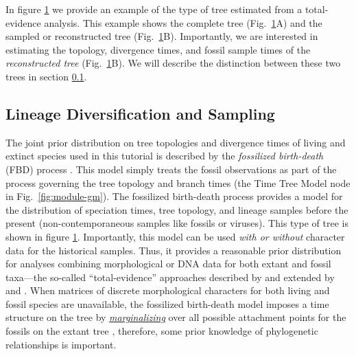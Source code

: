 In figure \ref{fig:example-tree} we provide an example of the type of tree estimated from a total-evidence analysis.
This example shows the complete tree (Fig.\ \ref{fig:example-tree}A) and the sampled or reconstructed tree (Fig.\ \ref{fig:example-tree}B). 
Importantly, we are interested in estimating the topology, divergence times, and fossil sample times of the \textit{reconstructed tree} (Fig.\ \ref{fig:example-tree}B). 
We will describe the distinction between these two trees in section \ref{subsect:Intro-FBD}.
\begin{figure}[h!]
\label{fig:example-tree}
\end{figure}


\subsection{Lineage Diversification and Sampling}\label{subsect:Intro-FBD}

The joint prior distribution on tree topologies and divergence times of living and extinct species used in this tutorial is described by the \textit{fossilized birth-death} (FBD) process \citep{Stadler2010, Heath2014}. 
This model simply treats the fossil observations as part of the process governing the tree topology and branch times (the \textsf{Time Tree Model} node in Fig.\ \ref{fig:module-gm}). 
The fossilized birth-death process provides a model for the distribution of speciation times, tree topology, and lineage samples before the present (\EG non-contemporaneous samples like fossils or viruses). 
This type of tree is shown in figure \ref{fig:example-tree}. 
Importantly, this model can be used \textit{with or without} character data for the historical samples. 
Thus, it provides a reasonable prior distribution for analyses combining morphological or DNA data for both extant and fossil taxa---\IE the so-called ``total-evidence'' approaches described by \citet{Ronquist2012a} and extended by \citet{Zhang2016} and \citet{Gavryushkina2016}. 
When matrices of discrete morphological characters for both living and fossil species are unavailable, the fossilized birth-death model imposes a time structure on the tree by \href{https://en.wikipedia.org/wiki/Marginal_distribution}{\textit{marginalizing}} over all possible attachment points for the fossils on the extant tree \citep{Heath2014}, therefore, some prior knowledge of phylogenetic relationships is important.



